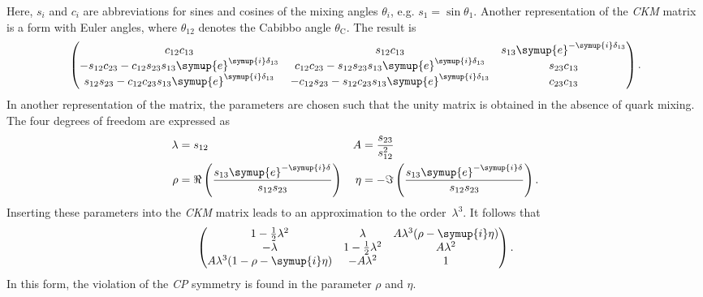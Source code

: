 Here, $s_i$ and $c_i$ are abbreviations for sines and cosines of the mixing angles $\theta_i$, e.g. $s_1=\sin\theta_1$. 
Another representation of the \textit{CKM} matrix is a form with Euler angles, where $\theta_{12}$ denotes the Cabibbo angle $\theta_{\mathrm{C}}$.
The result is
\begin{align*}
    \begin{pmatrix}
        c_{12}c_{13} & s_{12}c_{13} & s_{13}\symup{e}^{-\symup{i}\delta_{13}} \\
        -s_{12}c_{23} - c_{12}s_{23}s_{13}\symup{e}^{\symup{i}\delta_{13}} & c_{12}c_{23} - s_{12}s_{23}s_{13}\symup{e}^{\symup{i}\delta_{13}} & s_{23}c_{13} \\
        s_{12}s_{23} - c_{12}c_{23}s_{13}\symup{e}^{\symup{i}\delta_{13}} & -c_{12}s_{23} - s_{12}c_{23}s_{13}\symup{e}^{\symup{i}\delta_{13}} & c_{23}c_{13} \\
    \end{pmatrix}.
\end{align*}
In another representation of the matrix, the parameters are chosen such that the unity matrix is obtained in the absence of quark mixing. The four degrees of freedom
are expressed as 
\begin{align*}
    \lambda & = s_{12} & A &= \frac{s_{23}}{s_{12}^2} \\
    \rho &= \Re\left(\frac{s_{13}\symup{e}^{-\symup{i}\delta}}{s_{12}s_{23}}\right) & \eta&=-\Im\left(\frac{s_{13}\symup{e}^{-\symup{i}\delta}}{s_{12}s_{23}}\right). \\
\end{align*}
Inserting these parameters into the \textit{CKM} matrix leads to an approximation to the order~$\lambda^3$. It follows that
\begin{align*}
    \begin{pmatrix}
        1-\frac{1}{2}\lambda^2 & \lambda & A\lambda^3(\rho-\symup{i}\eta) \\
        -\lambda & 1-\frac{1}{2}\lambda^2 & A\lambda^2 \\
        A\lambda^3(1-\rho-\symup{i}\eta) & -A\lambda^2 & 1 \\
    \end{pmatrix}.
\end{align*}
In this form, the violation of the \textit{CP} symmetry is found in the parameter $\rho$ and $\eta$.

